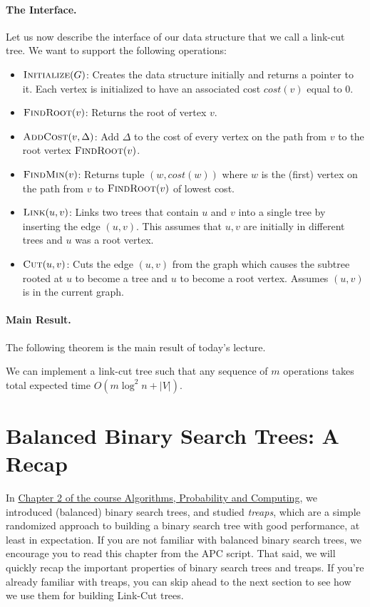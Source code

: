 \paragraph{The Interface.} Let us now describe the interface of our data structure that we call a link-cut tree. We want to support the following operations:
\begin{itemize}
    \item $\textsc{Initialize}(G)$: Creates the data structure initially and returns a pointer to it. Each vertex is initialized to have an associated cost $cost(v)$ equal to $0$.
    \item $\textsc{FindRoot}(v)$: Returns the root of vertex $v$. 
    \item $\textsc{AddCost}(v, \Delta)$: Add $\Delta$ to the cost of every vertex on the path from $v$ to the root vertex $\textsc{FindRoot}(v)$.
    \item $\textsc{FindMin}(v)$: Returns tuple $(w, cost(w))$ where $w$ is the (first) vertex on the path from $v$ to $\textsc{FindRoot}(v)$ of lowest cost. 
    \item $\textsc{Link}(u,v)$: Links two trees that contain $u$ and $v$ into a single tree by inserting the edge $(u,v)$. This assumes that $u, v$ are initially in different trees and $u$ was a root vertex.
    \item $\textsc{Cut}(u,v)$: Cuts the edge $(u,v)$ from the graph which causes the subtree rooted at $u$ to become a tree and $u$ to become a root vertex. Assumes $(u,v)$ is in the current graph.
\end{itemize}

\paragraph{Main Result.} The following theorem is the main result of today's lecture.

\begin{theorem}\label{thm:mainTheoremLinkCutTree}
We can implement a link-cut tree such that any sequence of $m$ operations takes total expected time $O(m \log^2 n + |V|)$.
\end{theorem}



\section{Balanced Binary Search Trees: A Recap}
In \href{https://kyng.inf.ethz.ch/courses/APC21/Chapter_2.pdf}{Chapter 2 of the course Algorithms, Probability and Computing}, we introduced (balanced) binary search trees, and studied \emph{treaps}, which are a simple randomized approach to building a binary search tree with good performance, at least in expectation.
If you are not familiar with balanced binary search trees, we encourage you to read this chapter from the APC script. 
That said, we will quickly recap the important properties of binary search trees and treaps.
If you're already familiar with treaps, you can skip ahead to the next section to see how we use them for building Link-Cut trees.
%


